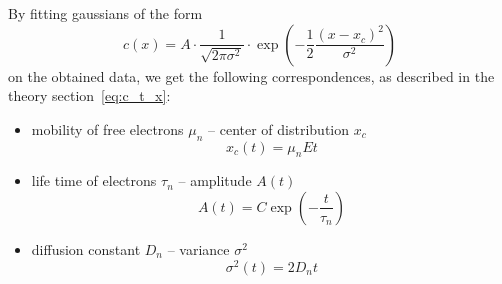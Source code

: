By fitting gaussians of the form 
\begin{equation}
    c(x) = A \cdot \frac{1}{\sqrt{2 \pi \sigma^2}} 
    \cdot \exp\left( -\frac{1}{2}\frac{\left( x - x_c \right)^2}{\sigma^2} \right)
    \label{eq:gaussian}
\end{equation}
on the obtained data, we get the following 
correspondences, as described in the theory section~\ref{eq:c_t_x}: 
\begin{itemize}
    \item
        mobility of free electrons $\mu_n$ -- 
        center of distribution $x_c$
        \begin{equation}
            x_c(t) = \mu_n E t
        \end{equation}
    \item
        life time of electrons $\tau_n$ --
        amplitude $A(t)$
        \begin{equation}
            A(t) = C \exp\left(-\frac{t}{\tau_n}\right)
        \end{equation}
    \item
        diffusion constant $D_n$ --
        variance $\sigma^2$
        \begin{equation}
            \sigma^2(t) = 2 D_n t
        \end{equation}
\end{itemize}

